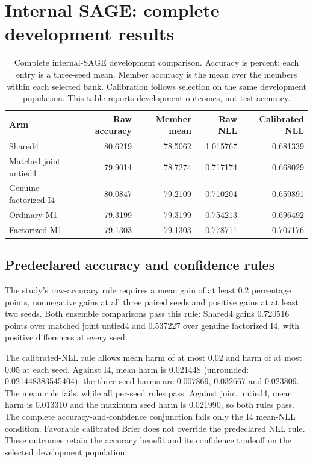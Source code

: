\section{Internal SAGE: complete development results}\label{app:internal-sage-F}
\begin{table}[t]
\centering\small
\setlength{\tabcolsep}{4pt}
\caption{Complete internal-SAGE development comparison. Accuracy is percent; each entry is a three-seed mean. Member accuracy is the mean over the members within each selected bank. Calibration follows selection on the same development population. This table reports development outcomes, not test accuracy.}
\label{tab:internal-sage-F}
\begin{tabular}{lrrrr}
\toprule
Arm & Raw accuracy & Member mean & Raw NLL & Calibrated NLL\\
\midrule
Shared4 & 80.6219 & 78.5062 & 1.015767 & 0.681339\\
Matched joint untied4 & 79.9014 & 78.7274 & 0.717174 & 0.668029\\
Genuine factorized I4 & 80.0847 & 79.2109 & 0.710204 & 0.659891\\
Ordinary M1 & 79.3199 & 79.3199 & 0.754213 & 0.696492\\
Factorized M1 & 79.1303 & 79.1303 & 0.778711 & 0.707176\\
\bottomrule
\end{tabular}
\end{table}

\subsection{Predeclared accuracy and confidence rules}\label{app:internal-sage-F-gates}
The study's raw-accuracy rule requires a mean gain of at least 0.2 percentage points, nonnegative gains at all three paired seeds and positive gains at at least two seeds. Both ensemble comparisons pass this rule: Shared4 gains 0.720516 points over matched joint untied4 and 0.537227 over genuine factorized I4, with positive differences at every seed.

The calibrated-NLL rule allows mean harm of at most 0.02 and harm of at most 0.05 at each seed. Against I4, mean harm is 0.021448 (unrounded: 0.021448383545404); the three seed harms are 0.007869, 0.032667 and 0.023809. The mean rule fails, while all per-seed rules pass. Against joint untied4, mean harm is 0.013310 and the maximum seed harm is 0.021990, so both rules pass. The complete accuracy-and-confidence conjunction fails only the I4 mean-NLL condition. Favorable calibrated Brier does not override the predeclared NLL rule. These outcomes retain the accuracy benefit and its confidence tradeoff on the selected development population.
